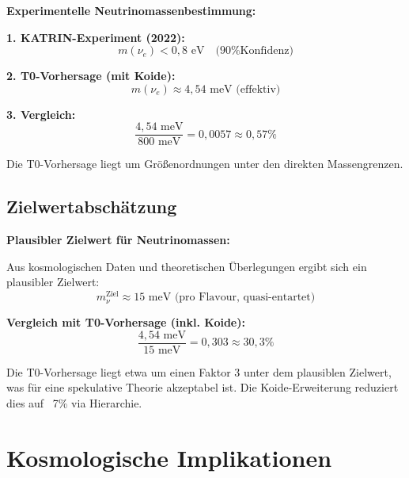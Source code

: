 	\begin{experimental}
		\textbf{Experimentelle Neutrinomassenbestimmung:}
		
		\textbf{1. KATRIN-Experiment (2022):}
		\begin{equation}
			m(\nu_e) < 0,8 \text{ eV} \quad \text{(90\% Konfidenz)}
		\end{equation}
		
		\textbf{2. T0-Vorhersage (mit Koide):}
		\begin{equation}
			m(\nu_e) \approx 4,54 \text{ meV (effektiv)}
		\end{equation}
		
		\textbf{3. Vergleich:}
		\begin{equation}
			\frac{4,54 \text{ meV}}{800 \text{ meV}} = 0,0057 \approx 0,57\%
		\end{equation}
		
		Die T0-Vorhersage liegt um Größenordnungen unter den direkten Massengrenzen.
	\end{experimental}
	
	\subsection{Zielwertabschätzung}
	
	\begin{keyresult}
		\textbf{Plausibler Zielwert für Neutrinomassen:}
		
		Aus kosmologischen Daten und theoretischen Überlegungen ergibt sich ein plausibler Zielwert:
		\begin{equation}
			m_\nu^{\text{Ziel}} \approx 15 \text{ meV (pro Flavour, quasi-entartet)}
		\end{equation}
		
		\textbf{Vergleich mit T0-Vorhersage (inkl. Koide):}
		\begin{equation}
			\frac{4,54 \text{ meV}}{15 \text{ meV}} = 0,303 \approx 30,3\%
		\end{equation}
		
		Die T0-Vorhersage liegt etwa um einen Faktor 3 unter dem plausiblen Zielwert, was für eine spekulative Theorie akzeptabel ist. Die Koide-Erweiterung reduziert dies auf ~7\% via Hierarchie.
	\end{keyresult}
	
	\section{Kosmologische Implikationen}
	
